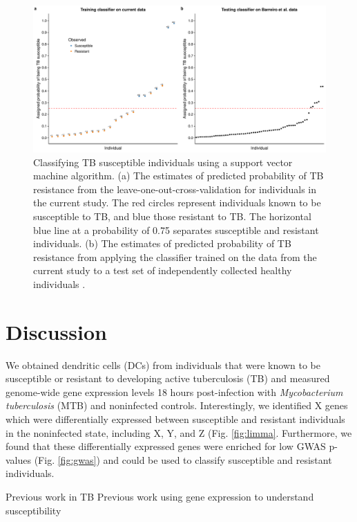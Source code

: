\documentclass[fleqn,10pt]{wlscirep}
\begin{document}
\begin{figure}[ht]
\centering
\includegraphics[width=\linewidth]{../figure/classifier-svm.pdf}
\caption{
Classifying TB susceptible individuals using a support vector machine algorithm. (a) The estimates of predicted probability of TB resistance from the leave-one-out-cross-validation for individuals in the current study. The red circles represent individuals known to be susceptible to TB, and blue those resistant to TB. The horizontal blue line at a probability of 0.75 separates susceptible and resistant individuals. (b) The estimates of predicted probability of TB resistance from applying the classifier trained on the data from the current study to a test set of independently collected healthy individuals \cite{Barreiro2012}.
}
\label{fig:classifier}
\end{figure}

\section*{Discussion}

We obtained dendritic cells (DCs) from individuals that were known to be susceptible or resistant to developing active tuberculosis (TB) and measured genome-wide gene expression levels 18 hours post-infection with \emph{Mycobacterium tuberculosis} (MTB) and noninfected controls. Interestingly, we identified X genes which were differentially expressed between susceptible and resistant individuals in the noninfected state, including X, Y, and Z (Fig. \ref{fig:limma}. Furthermore, we found that these differentially expressed genes were enriched for low GWAS p-values (Fig. \ref{fig:gwas}) and could be used to classify susceptible and resistant individuals. 

Previous work in TB \cite{Thuong2008}
Previous work using gene expression to understand susceptibility \cite{Bryant2014}
\end{document}
